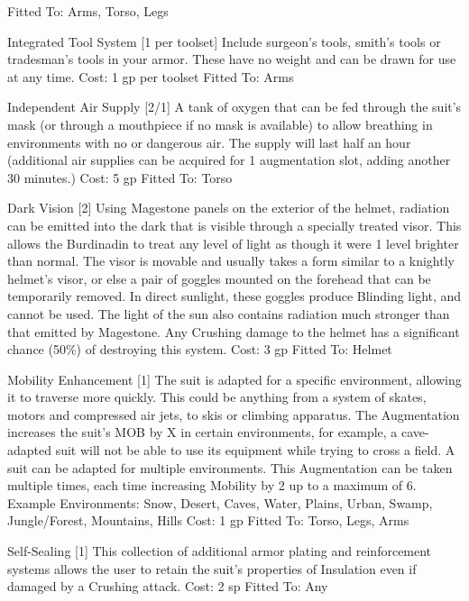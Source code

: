 \documentclass[oneside,11pt,english]{book}
\begin{document}
Fitted To: Arms, Torso, Legs 

 

Integrated Tool System [1 per toolset] 
Include surgeon’s tools, smith’s tools or tradesman’s tools in your armor. These have no weight and can 
be drawn for use at any time. 
Cost: 1 gp per toolset 
Fitted To: Arms 

 

Independent Air Supply [2/1] 
A tank of oxygen that can be fed through the suit’s mask (or through a mouthpiece if no mask is 
available) to allow breathing in environments with no or dangerous air. The supply will last half an hour 
(additional air supplies can be acquired for 1 augmentation slot, adding another 30 minutes.) 
Cost: 5 gp 
Fitted To: Torso 

 

Dark Vision [2] 
Using Magestone panels on the exterior of the helmet, radiation can be emitted into the dark that is visible 
through a specially treated visor. This allows the Burdinadin to treat any level of light as though it were 1 
level brighter than normal. The visor is movable and usually takes a form similar to a knightly helmet’s 
visor, or else a pair of goggles mounted on the forehead that can be temporarily removed. In direct 
sunlight, these goggles produce Blinding light, and cannot be used. The light of the sun also contains 
radiation much stronger than that emitted by Magestone. Any Crushing damage to the helmet has a 
significant chance (50\%) of destroying this system. 
Cost: 3 gp 
Fitted To: Helmet 

 

Mobility Enhancement [1] 
The suit is adapted for a specific environment, allowing it to traverse more quickly. This could be 
anything from a system of skates, motors and compressed air jets, to skis or climbing apparatus. The 
Augmentation increases the suit’s MOB by X in certain environments, for example, a cave-adapted suit 
will not be able to use its equipment while trying to cross a field. A suit can be adapted for multiple 
environments. This Augmentation can be taken multiple times, each time increasing Mobility by 2 up to a 
maximum of 6. 
Example Environments: Snow, Desert, Caves, Water, Plains, Urban, Swamp, Jungle/Forest, Mountains, 
Hills 
Cost: 1 gp 
Fitted To: Torso, Legs, Arms 

 

Self-Sealing [1] 
This collection of additional armor plating and reinforcement systems allows the user to retain the suit’s 
properties of Insulation even if damaged by a Crushing attack. 
Cost: 2 sp 
Fitted To: Any 
\end{document}
